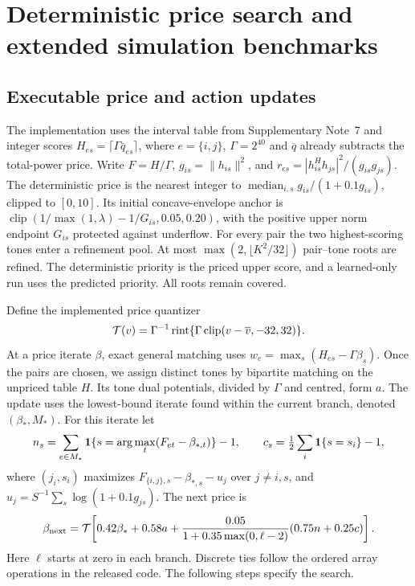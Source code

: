 
\section{Deterministic price search and extended simulation benchmarks}\label{supp:note4}

\subsection{Executable price and action updates}
The implementation uses the interval table from Supplementary Note~7 and integer
scores \(H_{es}=\lceil\Gamma\overline q_{es}\rceil\), where \(e=\{i,j\}\),
\(\Gamma=2^{40}\) and \(\overline q\) already subtracts the total-power price.
Write \(F=H/\Gamma\), \(g_{is}=\|h_{is}\|^2\), and
\(r_{es}=|h_{is}^{H}h_{js}|^2/(g_{is}g_{js})\).
The deterministic price is the nearest integer to
\(\operatorname{median}_{i,s}g_{is}/(1+0.1g_{is})\), clipped to \([0,10]\).
Its initial concave-envelope anchor is
\(\operatorname{clip}(1/\max(1,\lambda)-1/G_{is},0.05,0.20)\), with
the positive upper norm endpoint \(G_{is}\) protected against underflow.
For every pair the two highest-scoring tones enter a refinement pool.
At most \(\max(2,\lfloor K^2/32\rfloor)\) pair--tone roots are refined.
The deterministic priority is the priced upper score, and a learned-only run uses
the predicted priority. All roots remain covered.

Define the implemented price quantizer
\[
 {\cal T}(v)=\Gamma^{-1}\operatorname{rint}
 \{\Gamma\operatorname{clip}(v-\overline v,-32,32)\}.
\]
At a price iterate \(\beta\), exact general matching uses
\(w_e=\max_s(H_{es}-\Gamma\beta_s)\).
Once the pairs are chosen, we assign distinct tones by bipartite matching on the unpriced table \(H\).
Its tone dual potentials, divided by \(\Gamma\) and centred, form \(a\).
The update uses the lowest-bound iterate found within the current branch,
denoted \((\beta_*,M_*)\). For this iterate let
\[
 n_s=\sum_{e\in M_*}{\bf1}
 \{s=\arg\max_t(F_{et}-\beta_{*,t})\}-1,\qquad
 c_s=\tfrac12\sum_i{\bf1}\{s=s_i\}-1 ,
\]
where \((j_i,s_i)\) maximizes \(F_{\{i,j\},s}-\beta_{*,s}-u_j\) over
\(j\ne i,s\), and \(u_j=S^{-1}\sum_s\log(1+0.1g_{js})\).
The next price is
\begin{equation}\label{supp:priceupdate}
 \beta_{\rm next}={\cal T}\!\left[
 0.42\beta_*+0.58a+
 \frac{0.05}{1+0.35\max(0,\ell-2)}
 (0.75n+0.25c)\right].
\end{equation}
Here \(\ell\) starts at zero in each branch. Discrete ties follow the ordered
array operations in the released code. The following steps specify the search.

